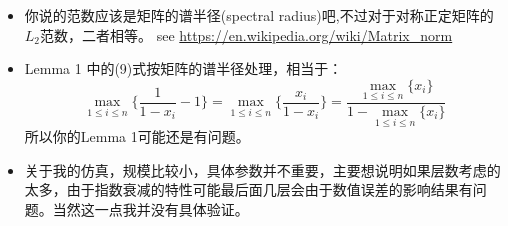 \documentclass{article}
\begin{document}
\begin{itemize}
\item{你说的范数应该是矩阵的谱半径(spectral radius)吧,不过对于对称正定矩阵的$L_2$范数，二者相等。
see \href{https://en.wikipedia.org/wiki/Matrix_norm}{https://en.wikipedia.org/wiki/Matrix\_norm}
}
\item Lemma 1 中的(9)式按矩阵的谱半径处理，相当于：
\begin{equation}
\max_{1\leq i\leq n} \{\frac{1}{1-x_i}-1\} =\boxed{ \max_{1\leq i\leq n} \{\frac{x_i}{1-x_i}\}= \frac{\max_{1\leq i\leq n}\{x_i\}}{1-\max_{1\leq i\leq n}\{x_i\}}}
\end{equation}
所以你的Lemma 1可能还是有问题。
\item 关于我的仿真，规模比较小，具体参数并不重要，主要想说明如果层数考虑的太多，由于指数衰减的特性可能最后面几层会由于数值误差的影响结果有问题。当然这一点我并没有具体验证。
\end{itemize}
\end{document}
